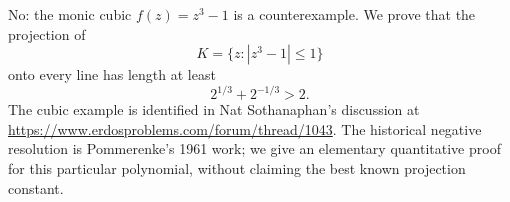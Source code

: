 No: the monic cubic $f(z)=z^3-1$ is a counterexample. We prove that the projection of
\[
 K=\{z:|z^3-1|\le1\}
\]
onto every line has length at least
\[
 2^{1/3}+2^{-1/3}>2. \tag{1}
\]
The cubic example is identified in Nat Sothanaphan's discussion at \url{https://www.erdosproblems.com/forum/thread/1043}. The historical negative resolution is Pommerenke's 1961 work; we give an elementary quantitative proof for this particular polynomial, without claiming the best known projection constant.
